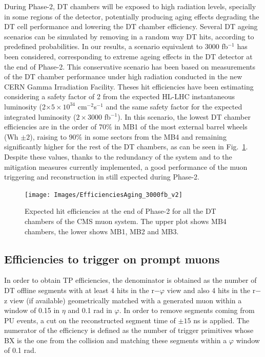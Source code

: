 \documentclass[../main.tex]{subfiles}
\begin{document}
During Phase-2, DT chambers will be exposed to high radiation levels, specially in some regions of the detector, potentially producing aging effects degrading the DT cell performance and lowering the DT chamber efficiency. Several DT ageing scenarios can be simulated by removing in a random way DT hits, according to predefined probabilities. In our results, a scenario equivalent to 3000 fb${}^{-1}$ has been considered, corresponding to extreme ageing effects in the DT detector at the end of Phase-2. This conservative scenario has been based on measurements of the DT chamber performance under high radiation conducted in the new CERN Gamma Irradiation Facility. Theses hit efficiencies have been estimating considering a safety factor of 2 from the expected HL-LHC instantaneous luminosity (2$\times 5\times 10^{34}$ cm${}^{-2}$s${}^{-1}$ and the same safety factor for the expected integrated luminosity ($2\times$3000 fb${}^{-1}$). In this scenario, the lowest DT chamber efficiencies are in the order of 70$\%$ in MB1 of the most external barrel wheels (Wh $\pm2$), raising to 90$\%$ in some sectors from the MB4 and remaining significantly higher for the rest of the DT chambers, as can be seen in Fig.~\ref{dts:fig:ageing}. Despite these values, thanks to the redundancy of the system and to the mitigation measures currently implemented, a good performance of the muon triggering and reconstruction in still expected during Phase-2.

\begin{figure}[h!]
\begin{center}
\texttt{[image: Images/EfficienciesAging\_3000fb\_v2]}
\end{center}
\caption{Expected hit efficiencies at the end of Phase-2 for all the DT chambers of the CMS muon system. The upper plot shows MB4 chambers, the lower shows MB1, MB2 and MB3.}
\label{dts:fig:ageing}
\end{figure}

\subsection{Efficiencies to trigger on prompt muons}

In order to obtain TP efficiencies, the denominator is obtained as the number of DT offline segments with at least 4 hits in the r$-\varphi$ view and also 4 hits in the r$-$z view (if available) geometrically matched with a generated muon within a window of 0.15 in $\eta$ and 0.1 rad in $\varphi$. In order to remove segments coming from PU events, a cut on the reconstructed segment time of $\pm 15$ ns is applied. The numerator of the efficiency is defined as the number of trigger primitives whose BX is the one from the collision and matching these segments within a $\varphi$ window of 0.1 rad.
\end{document}
